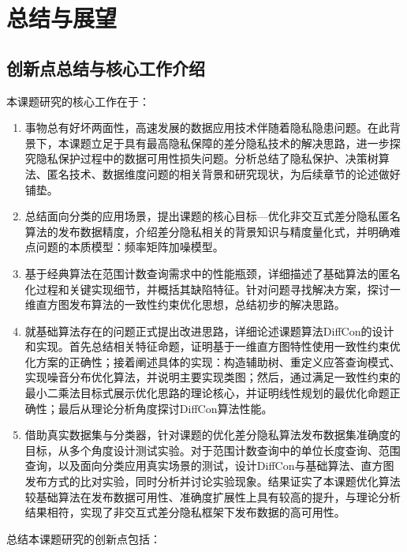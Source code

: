 
\chapter{总结与展望}

\section{创新点总结与核心工作介绍}

本课题研究的核心工作在于：
\begin{enumerate}
	\item 事物总有好坏两面性，高速发展的数据应用技术伴随着隐私隐患问题。在此背景下，本课题立足于具有最高隐私保障的差分隐私技术的解决思路，进一步探究隐私保护过程中的数据可用性损失问题。分析总结了隐私保护、决策树算法、匿名技术、数据维度问题的相关背景和研究现状，为后续章节的论述做好铺垫。
	\item 总结面向分类的应用场景，提出课题的核心目标---优化非交互式差分隐私匿名算法的发布数据精度，介绍差分隐私相关的背景知识与精度量化式，并明确难点问题的本质模型：频率矩阵加噪模型。
	\item 基于经典算法在范围计数查询需求中的性能瓶颈，详细描述了基础算法的匿名化过程和关键实现细节，并概括其缺陷特征。针对问题寻找解决方案，探讨一维直方图发布算法的一致性约束优化思想，总结初步的解决思路。
	\item 就基础算法存在的问题正式提出改进思路，详细论述课题算法DiffCon的设计和实现。首先总结相关特征命题，证明基于一维直方图特性使用一致性约束优化方案的正确性；接着阐述具体的实现：构造辅助树、重定义应答查询模式、实现噪音分布优化算法，并说明主要实现类图；然后，通过满足一致性约束的最小二乘法目标式展示优化思路的理论核心，并证明线性规划的最优化命题正确性；最后从理论分析角度探讨DiffCon算法性能。
	\item 借助真实数据集与分类器，针对课题的优化差分隐私算法发布数据集准确度的目标，从多个角度设计测试实验。对于范围计数查询中的单位长度查询、范围查询，以及面向分类应用真实场景的测试，设计DiffCon与基础算法、直方图发布方式的比对实验，同时分析并讨论实验现象。结果证实了本课题优化算法较基础算法在发布数据可用性、准确度扩展性上具有较高的提升，与理论分析结果相符，实现了非交互式差分隐私框架下发布数据的高可用性。
\end{enumerate}	

总结本课题研究的创新点包括：

